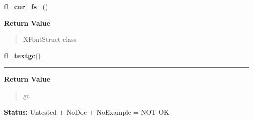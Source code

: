     \label{xformslib:library:fl_cur_fs_}

    \vspace{0.5ex}

\hspace{.8\funcindent}\begin{boxedminipage}{\funcwidth}

    \raggedright \textbf{fl\_cur\_fs\_}()

\setlength{\parskip}{2ex}
\setlength{\parskip}{1ex}
      \textbf{Return Value}
    \vspace{-1ex}

      \begin{quote}
      XFontStruct class

      \end{quote}

    \end{boxedminipage}

    \label{xformslib:library:fl_textgc_}

    \vspace{0.5ex}

\hspace{.8\funcindent}\begin{boxedminipage}{\funcwidth}

    \raggedright \textbf{fl\_textgc}()

    \vspace{-1.5ex}

    \rule{\textwidth}{0.5\fboxrule}
\setlength{\parskip}{2ex}
\setlength{\parskip}{1ex}
      \textbf{Return Value}
    \vspace{-1ex}

      \begin{quote}
      gc

      \end{quote}

\textbf{Status:} Untested + NoDoc + NoExample = NOT OK



    \end{boxedminipage}

    \label{xformslib:library:fl_gc_}

